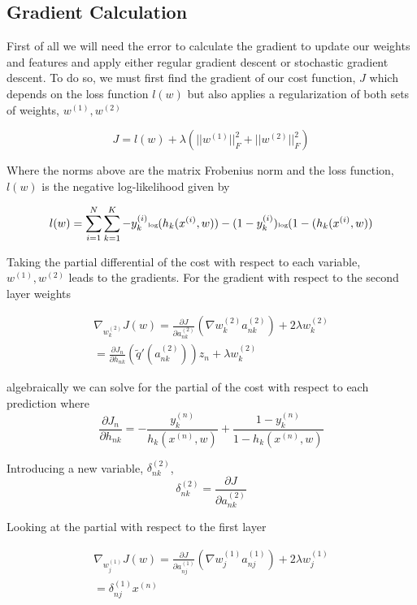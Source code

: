 \documentclass[12pt, twocolumn]{article}
\begin{document}
\subsection{Gradient Calculation}
First of all we will need the error to calculate the gradient to update our weights and features and apply either regular gradient descent or stochastic gradient descent. To do so,  we must first find the gradient of our cost function, $J$ which depends on the loss function $l(w)$ but also applies a regularization of both sets of weights, $w^{(1)}, w^{(2)}$

\begin{equation}
J= l(w) + \lambda ( ||w^{(1)}||^2_F +||w^{(2)}||^2_F)
\end{equation}

Where the norms above are the matrix Frobenius norm and the loss function, $l(w)$ is the  negative log-likelihood given by 

\begin{equation}
\tiny
l(w)= \sum_{i=1}^N \sum_{k=1}^K -y^{(i)}_k \textrm{log}(h_k(x^{(i)}, w)) - (1 -y^{(i)}_k) \textrm{log}(1 -(h_k(x^{(i)}, w))
\end {equation}


Taking the partial differential of the cost with respect to each variable, $w^{(1)},w^{(2)}$ leads to the gradients. For the gradient with respect to the second layer weights 

\begin{align}
\nabla_{w_k^{(2)}} J (w)= \frac{\partial J}{\partial a^{(2)}_{nk}}  (\nabla w_k^{(2)} a_{nk}^{(2)})  +2 \lambda w_k^{(2)} \\
=\frac{\partial J_n}{\partial h_{nk}} (\tilde{q}' (a_{nk}^{(2)}))z_n + \lambda w_k^{(2)}
\end{align}


algebraically we can solve for the partial of the cost with respect to each prediction where  
\begin{equation}
\frac{\partial J_n}{\partial h_{nk}}= -\frac{y_k^{(n)}}{h_k(x^{(n)},w)} + \frac{1- y_k^{(n)}}{1 - h_k(x^{(n)},w)}
\end{equation}

 Introducing a new variable, $\delta_{nk}^{(2)}$, 
\begin{equation}
\delta_{nk}^{(2)}=\frac{\partial J}{\partial a^{(2)}_{nk}} 
\end{equation}


Looking at the partial with respect to the first layer 

\begin{align}
\nabla_{w_j^{(1)}} J (w)= \frac{\partial J}{\partial a^{(1)}_{nj}}  (\nabla w_j^{(1)} a_{nj}^{(1)}) + 2 \lambda w_j^{(1)}  \\
 = \delta_{nj}^{(1)}  x^{(n)}
\end{align}
\end{document}
